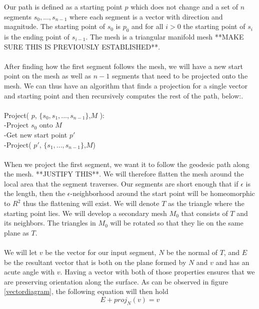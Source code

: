 Our path is defined as a starting point $p$ which does not change and a set of $n$ segments $s_0,...,s_{n-1}$ where each segment is a vector with direction and magnitude. The starting point of $s_0$ is $p_0$ and for all $i>0$ the starting point of $s_i$ is the ending point of $s_{i-1}$. The mesh is a triangular manifold mesh **MAKE SURE THIS IS PREVIOUSLY ESTABLISHED**. \\
\\
After finding how the first segment follows the mesh, we will have a new start point on the mesh as well as $n-1$ segments that need to be projected onto the mesh. We can thus have an algorithm that finds a projection for a single vector and starting point and then recursively computes the rest of the path, below:.\\
\\
Project( $p$, $\{s_0,s_1,...,s_{n-1}\}$,$M$ ):\\
-Project $s_0$ onto $M$\\
-Get new start point $p'$\\
-Project( $p'$, $\{s_1,...,s_{n-1}\}$,$M$)\\ 
\\
When we project the first segment, we want it to follow the geodesic path along the mesh. **JUSTIFY THIS**. We will therefore flatten the mesh around the local area that the segment traverses. Our segments are short enough that if $\epsilon$ is the length, then the $\epsilon$-neighborhood around the start point will be homeomorphic to $R^2$ thus the flattening will exist. We will denote $T$ as the triangle where the starting point lies. We will develop a secondary mesh $M_0$ that consists of $T$ and its neighbors. The triangles in $M_0$ will be rotated so that they lie on the same plane as $T$. \\
\\
We will let $v$ be the vector for our input segment, $N$ be the normal of $T$, and $E$ be the resultant vector that is both on the plane formed by $N$ and $v$ and has an acute angle with $v$. Having a vector with both of those properties ensures that we are preserving orientation along the surface. As can be observed in figure \ref{vectordiagram}, the following equation will then hold
\[
E + proj_N(v) = v
\]


